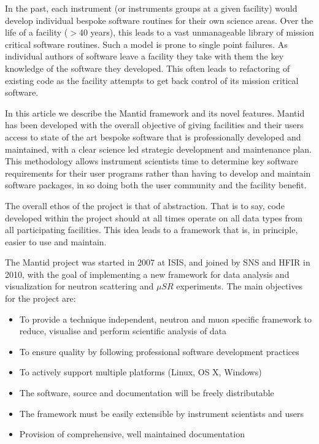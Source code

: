 \documentclass[1p]{elsarticle}
\begin{document}
In the past, each instrument (or instruments groups at a given facility) would develop individual bespoke software routines for their own science areas\cite{DAVE, OpenGenie, LAMP, ISAW}. Over the life of a facility ($>$40 years), this leads to a vast unmanageable library of mission critical software routines. Such a model is prone to single point failures. As individual authors of software leave a facility they take with them the key knowledge of the software they developed. This often leads to refactoring of existing code as the facility attempts to get back control of its mission critical software. 

In this article we describe the Mantid framework and its novel features. Mantid has been developed with the overall objective of giving facilities and their users access to state of the art bespoke software that is professionally developed and maintained, with a clear science led strategic development and maintenance plan.
This methodology allows instrument scientists time to determine key software requirements for their user programs rather than having to develop and maintain software packages, in so doing both the user community and the facility benefit.

The overall ethos of the project is that of abstraction. That is to say, code developed within the project should at all times operate on all data types from all participating facilities. This idea leads to a framework that is, in principle, easier to use and maintain.

The Mantid project\cite{mantiddoi} was started in 2007 at ISIS, and joined by SNS and HFIR in 2010, with the goal of implementing a new framework for data analysis and visualization for neutron scattering and $\mu SR$ experiments. 
The main objectives for the project are:
\begin{itemize}
\item To provide a technique independent, neutron and muon specific framework  to reduce, visualise and perform scientific analysis of data
\item To ensure quality by following professional software development practices
\item To actively support multiple platforms (Linux, OS X, Windows)
\item The software, source and documentation will be freely distributable
\item The framework must be easily extensible by instrument scientists and users
\item Provision of comprehensive, well maintained documentation
\end{itemize}
\end{document}

